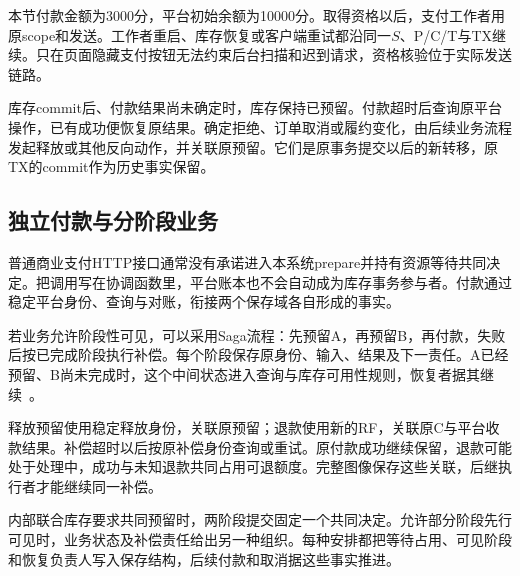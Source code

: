 本节付款金额为3000分，平台初始余额为10000分。取得资格以后，支付工作者用原scope和发送。工作者重启、库存恢复或客户端重试都沿同一$S$、P/C/T与TX继续。只在页面隐藏支付按钮无法约束后台扫描和迟到请求，资格核验位于实际发送链路。

库存commit后、付款结果尚未确定时，库存保持已预留。付款超时后查询原平台操作，已有成功便恢复原结果。确定拒绝、订单取消或履约变化，由后续业务流程发起释放或其他反向动作，并关联原预留。它们是原事务提交以后的新转移，原TX的commit作为历史事实保留。

\subsection{独立付款与分阶段业务}

普通商业支付HTTP接口通常没有承诺进入本系统prepare并持有资源等待共同决定。把调用写在协调函数里，平台账本也不会自动成为库存事务参与者。付款通过稳定平台身份、查询与对账，衔接两个保存域各自形成的事实。

若业务允许阶段性可见，可以采用Saga流程：先预留A，再预留B，再付款，失败后按已完成阶段执行补偿。每个阶段保存原身份、输入、结果及下一责任。A已经预留、B尚未完成时，这个中间状态进入查询与库存可用性规则，恢复者据其继续~\cite{sagas}。


释放预留使用稳定释放身份，关联原预留；退款使用新的RF，关联原C与平台收款结果。补偿超时以后按原补偿身份查询或重试。原付款成功继续保留，退款可能处于处理中，成功与未知退款共同占用可退额度。完整图像保存这些关联，后继执行者才能继续同一补偿。

内部联合库存要求共同预留时，两阶段提交固定一个共同决定。允许部分阶段先行可见时，业务状态及补偿责任给出另一种组织。每种安排都把等待占用、可见阶段和恢复负责人写入保存结构，后续付款和取消据这些事实推进。
\FloatBarrier
